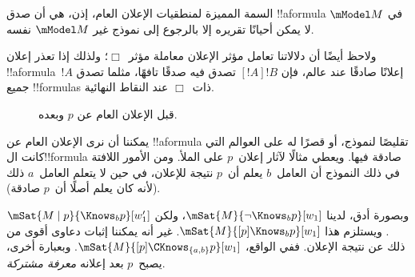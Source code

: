 \documentclass[../../../include/open-logic-section]{subfiles}
\begin{document}
السمة المميزة لمنطقيات الإعلان العام، إذن، هي أن صدق !!a{formula} في
$\mModel M$ لا يمكن أحيانًا تقريره إلا بالرجوع إلى نموذج غير
$\mModel M$ نفسه.

ولاحظ أيضًا أن دلالاتنا تعامل مؤثر الإعلان معاملة مؤثر~$\Box$؛ ولذلك
إذا تعذر إعلان !!a{formula}~$!A$ إعلانًا صادقًا عند عالم، فإن
$[!A]!B$ تصدق فيه صدقًا تافهًا، مثلما تصدق جميع !!{formula}s
ذات~$\Box$ عند النقاط النهائية.

\begin{figure}
  \begin{center}
  \end{center}
  \caption{قبل الإعلان العام عن $p$ وبعده.}
\end{figure}

يمكننا أن نرى الإعلان العام عن !!a{formula} تقليصًا لنموذج، أو قصرًا
له على العوالم التي كانت ال!!{formula} صادقة فيها. ويعطي
 مثالًا لآثار إعلان~$p$ على الملأ.
ومن الأمور اللافتة في ذلك النموذج أن العامل~$b$ يعلم أن~$p$ نتيجة
للإعلان، في حين لا يتعلم العامل~$a$ ذلك (لأنه كان يعلم أصلًا أن~$p$
صادقة).

وبصورة أدق، لدينا $\mSat{M}{\lnot \Knows_b p}[w_1]$، ولكن
$\mSat{M \mid p}{\Knows_b p}[w'_1]$. ويستلزم هذا
$\mSat{M}{[p] \Knows_b p}[w_1]$. غير أنه يمكننا إثبات دعاوى أقوى من
ذلك عن نتيجة الإعلان. ففي الواقع،
$\mSat{M}{[p]\CKnows_{\{a,b\}} p}[w_1]$. وبعبارة أخرى، يصبح~$p$ بعد
إعلانه \emph{معرفة مشتركة}.
\end{document}
